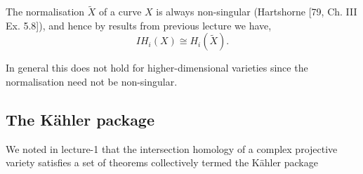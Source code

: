 \documentclass[11pt]{article}
\begin{document}
\vspace*{0.2cm} 

\noindent The normalisation $\tilde{X}$ of a curve $X$ is always non-singular (Hartshorne [79, Ch. III Ex. 5.8]), and hence by results from previous lecture we have,
$$
I H_i(X) \cong H_i(\tilde{X}) .
$$

In general this does not hold for higher-dimensional varieties since the normalisation need not be non-singular.

\subsection{The Kähler package}

We noted in lecture-1 that the intersection homology of a complex projective variety satisfies a set of theorems collectively termed the Kähler package
\end{document}
